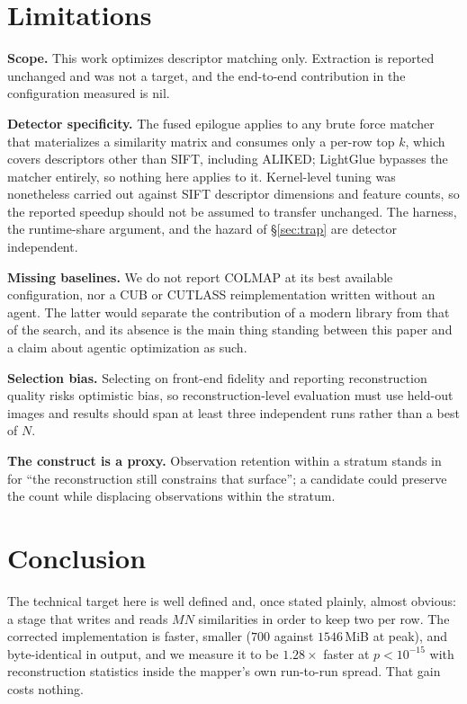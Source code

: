 \documentclass[conference]{IEEEtran}
\begin{document}
\section{Limitations}
\label{sec:limitations}

\textbf{Scope.} This work optimizes descriptor matching only. Extraction is
reported unchanged and was not a target, and the end-to-end contribution in the
configuration measured is nil.

\textbf{Detector specificity.} The fused epilogue applies to any brute force
matcher that materializes a similarity matrix and consumes only a per-row top
$k$, which covers descriptors other than SIFT, including ALIKED; LightGlue
bypasses the matcher entirely, so nothing here applies to it. Kernel-level
tuning was nonetheless carried out against SIFT descriptor dimensions and
feature counts, so the reported speedup should not be assumed to transfer
unchanged. The harness, the runtime-share argument, and the hazard of
\S\ref{sec:trap} are detector independent.

\textbf{Missing baselines.} We do not report COLMAP at its best available
configuration, nor a CUB or CUTLASS reimplementation written without an agent.
The latter would separate the contribution of a modern library from that of the
search, and its absence is the main thing standing between this paper and a
claim about agentic optimization as such.

\textbf{Selection bias.} Selecting on front-end fidelity and reporting
reconstruction quality risks optimistic bias, so reconstruction-level evaluation
must use held-out images and results should span at least three independent runs
rather than a best of $N$.

\textbf{The construct is a proxy.} Observation retention within a stratum stands
in for ``the reconstruction still constrains that surface''; a candidate could
preserve the count while displacing observations within the stratum.


\section{Conclusion}

The technical target here is well defined and, once stated plainly, almost
obvious: a stage that writes and reads $MN$ similarities in order to keep two
per row. The corrected implementation is faster, smaller ($700$ against
$1546$\,MiB at peak), and byte-identical in output, and we measure it to be
$1.28\times$ faster at $p < 10^{-15}$ with reconstruction statistics inside
the mapper's own run-to-run spread. That gain costs nothing.
\end{document}
